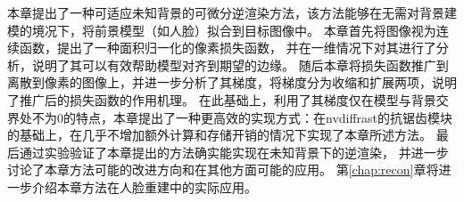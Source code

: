 本章提出了一种可适应未知背景的可微分逆渲染方法，该方法能够在无需对背景建模的境况下，将前景模型（如人脸）拟合到目标图像中。
本章首先将图像视为连续函数，提出了一种面积归一化的像素损失函数，
并在一维情况下对其进行了分析，说明了其可以有效帮助模型对齐到期望的边缘。
随后本章将损失函数推广到离散到像素的图像上，并进一步分析了其梯度，将梯度分为收缩和扩展两项，说明了推广后的损失函数的作用机理。
在此基础上，利用了其梯度仅在模型与背景交界处不为0的特点，本章提出了一种更高效的实现方式：在nvdiffrast的抗锯齿模块的基础上，在几乎不增加额外计算和存储开销的情况下实现了本章所述方法。
最后通过实验验证了本章提出的方法确实能实现在未知背景下的逆渲染，
并进一步讨论了本章方法可能的改进方向和在其他方面可能的应用。
第\ref{chap:recon}章将进一步介绍本章方法在人脸重建中的实际应用。
